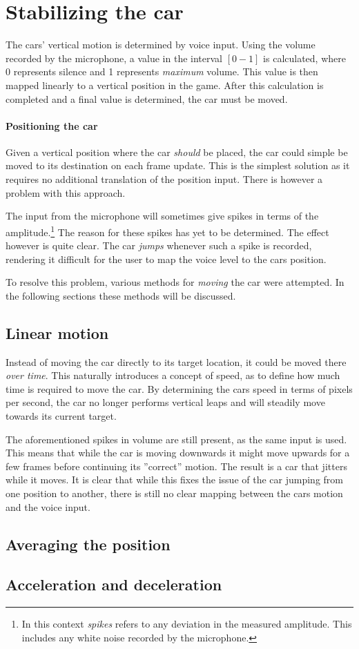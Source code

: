 \section{Stabilizing the car}
The cars' vertical motion is determined by voice input.
Using the volume recorded by the microphone, a value in the interval $[0-1]$ is calculated, where 0 represents silence and 1 represents \textit{maximum} volume.
This value is then mapped linearly to a vertical position in the game.
After this calculation is completed and a final value is determined, the car must be moved.

\paragraph{Positioning the car}
Given a vertical position where the car \textit{should} be placed, the car could simple be moved to its destination on each frame update.
This is the simplest solution as it requires no additional translation of the position input.
There is however a problem with this approach.

The input from the microphone will sometimes give spikes in terms of the amplitude.\footnote{In this context \textit{spikes} refers to any deviation in the measured amplitude.
This includes any white noise recorded by the microphone.}
The reason for these spikes has yet to be determined.
The effect however is quite clear.
The car \textit{jumps} whenever such a spike is recorded, rendering it difficult for the user to map the voice level to the cars position.

To resolve this problem, various methods for \textit{moving} the car were attempted.
In the following sections these methods will be discussed.

\subsection{Linear motion}
Instead of moving the car directly to its target location, it could be moved there \textit{over time}.
This naturally introduces a concept of speed, as to define how much time is required to move the car.
By determining the cars speed in terms of pixels per second, the car no longer performs vertical leaps and will steadily move towards its current target.

The aforementioned spikes in volume are still present, as the same input is used.
This means that while the car is moving downwards it might move upwards for a few frames before continuing its ''correct'' motion.
The result is a car that jitters while it moves.
It is clear that while this fixes the issue of the car jumping from one position to another, there is still no clear mapping between the cars motion and the voice input.

\subsection{Averaging the position}

\subsection{Acceleration and deceleration}

